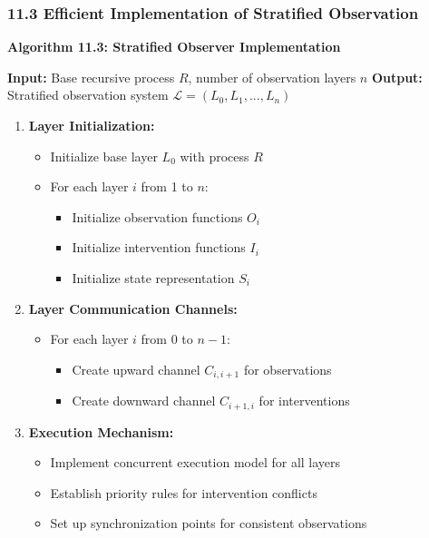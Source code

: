 \documentclass[
]{article}
\providecommand{\tightlist}{%
  \setlength{\itemsep}{0pt}\setlength{\parskip}{0pt}}
\begin{document}
\subsubsection{11.3 Efficient Implementation of Stratified
Observation}\label{efficient-implementation-of-stratified-observation}

\textbf{Algorithm 11.3: Stratified Observer Implementation}

\textbf{Input:} Base recursive process \(R\), number of observation
layers \(n\) \textbf{Output:} Stratified observation system
\(\mathcal{L} = (L_0, L_1, ..., L_n)\)

\begin{enumerate}
\def\labelenumi{\arabic{enumi}.}
\tightlist
\item
  \textbf{Layer Initialization:}

  \begin{itemize}
  \tightlist
  \item
    Initialize base layer \(L_0\) with process \(R\)
  \item
    For each layer \(i\) from 1 to \(n\):

    \begin{itemize}
    \tightlist
    \item
      Initialize observation functions \(O_i\)
    \item
      Initialize intervention functions \(I_i\)
    \item
      Initialize state representation \(S_i\)
    \end{itemize}
  \end{itemize}
\item
  \textbf{Layer Communication Channels:}

  \begin{itemize}
  \tightlist
  \item
    For each layer \(i\) from 0 to \(n-1\):

    \begin{itemize}
    \tightlist
    \item
      Create upward channel \(C_{i,i+1}\) for observations
    \item
      Create downward channel \(C_{i+1,i}\) for interventions
    \end{itemize}
  \end{itemize}
\item
  \textbf{Execution Mechanism:}

  \begin{itemize}
  \tightlist
  \item
    Implement concurrent execution model for all layers
  \item
    Establish priority rules for intervention conflicts
  \item
    Set up synchronization points for consistent observations
  \end{itemize}
\end{enumerate}
\end{document}
